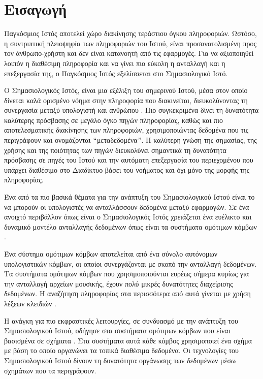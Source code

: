 \chapter{Εισαγωγή} 
 Παγκόσμιος Ιστός αποτελεί χώρο διακίνησης τεράστιου όγκου
πληροφοριών. Ωστόσο, η συντριπτική πλειοψηφία των πληροφοριών του
Ιστού, είναι προσανατολισμένη προς τον άνθρωπο-χρήστη και δεν
είναι κατανοητή από τις εφαρμογές. Για να αξιοποιηθεί λοιπόν η
διαθέσιμη πληροφορία και να γίνει πιο εύκολη η ανταλλαγή και η
επεξεργασία της, ο Παγκόσμιος Ιστός εξελίσσεται στο Σημασιολογικό
Ιστό.

Ο Σημασιολογικός Ιστός, είναι μια εξέλιξη του σημερινού Ιστού,
μέσα στον οποίο δίνεται καλά ορισμένο νόημα στην πληροφορία που
διακινείται, διευκολύνοντας τη συνεργασία μεταξύ υπολογιστή και
ανθρώπου \cite{LiArTs13}. Πιο συγκεκριμένα δίνει τη
δυνατότητα καλύτερης πρόσβασης σε μεγάλο όγκο πηγών πληροφορίας,
καθώς και πιο αποτελεσματικής διακίνησης των πληροφοριών,
χρησιμοποιώντας δεδομένα που τις περιγράφουν και ονομάζονται
$``$μεταδεδομένα$"$. Η καλύτερη γνώση της σημασίας, της χρήσης και
της ποιότητας των πηγών διευκολύνει σημαντικά τη δυνατότητα
πρόσβασης σε πηγές του Ιστού και την αυτόματη επεξεργασία του
περιεχομένου που υπάρχει διαθέσιμο στο Διαδίκτυο βάσει του
νοήματος και όχι μόνο της μορφής της πληροφορίας.

Ένα από τα πιο βασικά θέματα για την ανάπτυξη του Σημασιολογικού
Ιστού είναι το να μπορούν οι υπολογιστές να ανταλλάσσουν δεδομένα
 μεταξύ εφαρμογών. Σε ένα ανοιχτό περιβάλλον όπως
είναι ο Σημασιολογικός Ιστός χρειάζεται ένα ευέλικτο και δυναμικό
μοντέλο ανταλλαγής δεδομένων όπως είναι τα συστήματα ομότιμων
κόμβων .

Ένα σύστημα ομότιμων κόμβων αποτελείται από ένα σύνολο αυτόνομων
υπολογιστικών κόμβων, οι οποίοι συνεργάζονται με σκοπό την
ανταλλαγή δεδομένων. Τα συστήματα ομότιμων κόμβων που
χρησιμοποιούνται ευρέως σήμερα κυρίως για την ανταλλαγή αρχείων
μουσικής, έχουν πολύ μικρές δυνατότητες διαχείρισης δεδομένων. Η
αναζήτηση πληροφορίας στα περισσότερα από αυτά γίνεται με χρήση
λέξεων κλειδιών .

Η ανάγκη για πιο εκφραστικές λειτουργίες, σε συνδυασμό με την
ανάπτυξη του Σημασιολογικού Ιστού, οδήγησε στα συστήματα ομότιμων
κόμβων που είναι βασισμένα σε σχήματα . Στα συστήματα αυτά κάθε κόμβος
χρησιμοποιεί ένα σχήμα με βάση το οποίο οργανώνει τα τοπικά
διαθέσιμα δεδομένα. Οι τεχνολογίες του Σημασιολογικού Ιστού δίνουν
τη δυνατότητα οργάνωσης των δεδομένων μέσω σχημάτων που τα
περιγράφουν.


